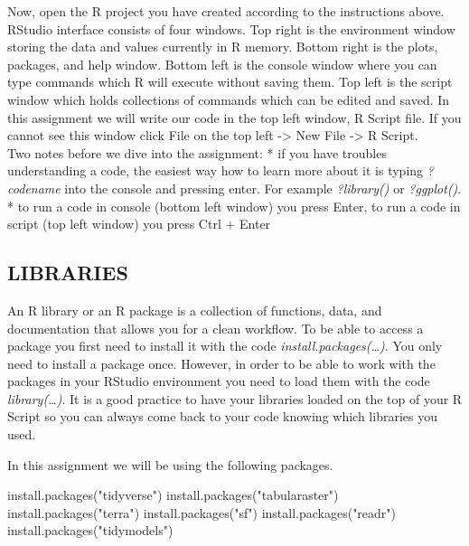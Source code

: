 \documentclass[
]{article}
\newenvironment{Shaded}{\begin{snugshade}}{\end{snugshade}}
\newcommand{\FunctionTok}[1]{\textcolor[rgb]{0.00,0.00,0.00}{#1}}
\newcommand{\NormalTok}[1]{#1}
\newcommand{\StringTok}[1]{\textcolor[rgb]{0.31,0.60,0.02}{#1}}
\begin{document}
Now, open the R project you have created according to the instructions
above. RStudio interface consists of four windows. Top right is the
environment window storing the data and values currently in R memory.
Bottom right is the plots, packages, and help window. Bottom left is the
console window where you can type commands which R will execute without
saving them. Top left is the script window which holds collections of
commands which can be edited and saved. In this assignment we will write
our code in the top left window, R Script file. If you cannot see this
window click File on the top left -\textgreater{} New File
-\textgreater{} R Script.\\
Two notes before we dive into the assignment: * if you have troubles
understanding a code, the easiest way how to learn more about it is
typing \emph{?codename} into the console and pressing enter. For example
\emph{?library()} or \emph{?ggplot()}. * to run a code in console
(bottom left window) you press Enter, to run a code in script (top left
window) you press Ctrl + Enter

\hypertarget{libraries}{%
\subsection{LIBRARIES}\label{libraries}}

An R library or an R package is a collection of functions, data, and
documentation that allows you for a clean workflow. To be able to access
a package you first need to install it with the code
\emph{install.packages(\ldots)}. You only need to install a package
once. However, in order to be able to work with the packages in your
RStudio environment you need to load them with the code
\emph{library(\ldots)}. It is a good practice to have your libraries
loaded on the top of your R Script so you can always come back to your
code knowing which libraries you used.

In this assignment we will be using the following packages.

\begin{Shaded}
\begin{Highlighting}[]
\FunctionTok{install.packages}\NormalTok{(}\StringTok{"tidyverse"}\NormalTok{)}
\FunctionTok{install.packages}\NormalTok{(}\StringTok{"tabularaster"}\NormalTok{)}
\FunctionTok{install.packages}\NormalTok{(}\StringTok{"terra"}\NormalTok{)}
\FunctionTok{install.packages}\NormalTok{(}\StringTok{"sf"}\NormalTok{)}
\FunctionTok{install.packages}\NormalTok{(}\StringTok{"readr"}\NormalTok{)}
\FunctionTok{install.packages}\NormalTok{(}\StringTok{"tidymodels"}\NormalTok{)}
\end{Highlighting}
\end{Shaded}
\end{document}
